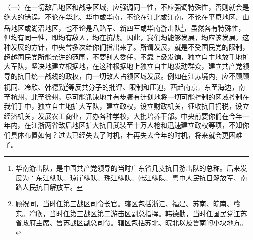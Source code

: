 \documentclass[cn,11pt,chinese]{elegantbook}
\begin{document}
（一）在一切敌后地区和战争区域，应强调同一性，不应强调特殊性，否则就会是绝大的错误。不论在华北、华中或华南，不论在江北或江南，不论在平原地区、山岳地区或湖沼地区，也不论是八路军、新四军或华南游击队\footnote[1]{ 华南游击队，是中国共产党领导的当时广东省几支抗日游击队的总称。后来发展为：东江纵队、琼崖纵队、珠江纵队、韩江纵队、粤中人民抗日解放军、南路人民抗日解放军。}，虽然各有特殊性，但均有同一性，即均有敌人，均在抗战。因此，我们均能够发展，均应该发展。这种发展的方针，中央曾多次给你们指出来了。所谓发展，就是不受国民党的限制，超越国民党所能允许的范围，不要别人委任，不靠上级发饷，独立自主地放手地扩大军队，坚决地建立根据地，在这种根据地上独立自主地发动群众，建立共产党领导的抗日统一战线的政权，向一切敌人占领区域发展。例如在江苏境内，应不顾顾祝同、冷欣、韩德勤\footnote[2]{ 顾祝同，当时任第三战区司令长官。辖区包括浙江、福建、苏南、皖南、赣东。冷欣，当时任第三战区第二游击区副总指挥。韩德勤，当时任国民党江苏省政府主席、鲁苏战区副总司令。辖区包括苏北、皖北以及鲁南的小块地方。}等反共分子的批评、限制和压迫，西起南京，东至海边，南至杭州，北至徐州，尽可能迅速地并有步骤有计划地将一切可能控制的区域控制在我们手中，独立自主地扩大军队，建立政权，设立财政机关，征收抗日捐税，设立经济机关，发展农工商业，开办各种学校，大批培养干部。中央前要你们在今年一年内，在江浙两省敌后地区扩大抗日武装至十万人枪和迅速建立政权等项，不知你们具体布置如何？过去已经失去了时机，若再失去今年的时机，将来就会更困难了。\\
\end{document}
